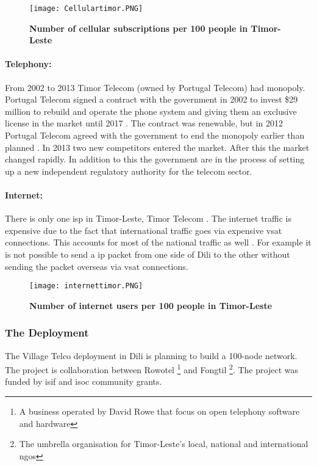 \begin{figure}[H]
\centering
\texttt{[image: Cellulartimor.PNG]}
\caption[Number of cellular subscriptions per 100 people in Timor-Leste]{\textbf{Number of cellular subscriptions per 100 people in Timor-Leste}}
\label{fig:cellulartimor}
\end{figure}

\paragraph{Telephony: }
From 2002 to 2013 Timor Telecom (owned by Portugal Telecom) had monopoly. Portugal Telecom signed a contract with the government in 2002 to invest \$29 million to rebuild and operate the phone system and giving them an exclusive license in the market until 2017 \cite{wikitelecomeasttimor}. The contract was renewable, but in 2012 Portugal Telecom agreed with the government to end the monopoly earlier than planned \cite{budde}. In 2013 two new competitors entered the market. After this the market changed rapidly. In addition to this the government are in the process of setting up a new independent regulatory authority for the telecom sector. 

\paragraph{Internet:} There is only one \gls{isp} in Timor-Leste, Timor Telecom \cite{wikitelecomeasttimor}. The internet traffic is expensive due to the fact that international traffic goes via expensive \gls{vsat} connections. This accounts for most of the national traffic as well \cite{vtdili}. For example it is not possible to send a \gls{ip} packet from one side of Dili to the other without sending the packet overseas via \gls{vsat} connections. 


\begin{figure}[H]
\centering
\texttt{[image: internettimor.PNG]}
\caption[Number of internet users per 100 people in Timor-Leste]{\textbf{Number of internet users per 100 people in Timor-Leste}}
\label{fig:internettimor}
\end{figure}

\subsubsection{The Deployment}
The Village Telco deployment in Dili is planning to build a 100-node network. The project is collaboration between Rowotel \footnote{A business operated by David Rowe that focus on open telephony software and hardware} and Fongtil \footnote{The umbrella organisation for Timor-Leste’s local, national and international \glspl{ngo} }. The project was funded by \gls{isif} and \gls{isoc} community grants. 

